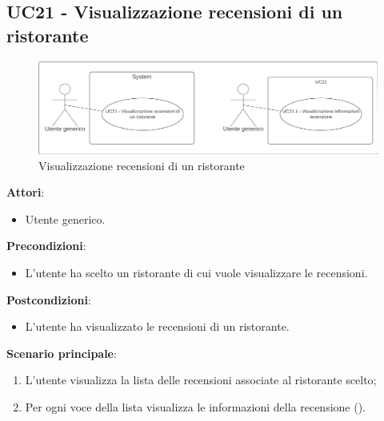 \subsection{UC21 - Visualizzazione recensioni di un ristorante}\label{usecase:21}
\begin{figure}[H]
    \centering
    \includegraphics[width=0.9\linewidth]{ucd/ucd21.png}
    \caption{Visualizzazione recensioni di un ristorante}
\end{figure}
\textbf{Attori}:
\begin{itemize}
    \item Utente generico.
\end{itemize}
\textbf{Precondizioni}:
\begin{itemize}
    \item L'utente ha scelto un ristorante di cui vuole visualizzare le recensioni.
\end{itemize}
\textbf{Postcondizioni}:
\begin{itemize}
    \item L'utente ha visualizzato le recensioni di un ristorante.
\end{itemize}
\textbf{Scenario principale}:
\begin{enumerate}
    \item L'utente visualizza la lista delle recensioni associate al ristorante scelto;
    \item Per ogni voce della lista visualizza le informazioni della recensione ().
\end{enumerate}

\newpage

